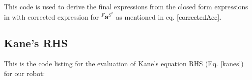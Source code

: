 \documentclass[a4paper,10pt]{article}
\begin{document}
This code is used to derive the final expressions from the closed form expressions in \cite{kim2005dynamic} with
corrected expression for ${}^F\mathbf{a}^{S^*}$ as mentioned in eq. \ref{correctedAcc}.




\subsection{Kane's RHS} \label{app4}

This is the code listing for the evaluation of Kane's equation RHS (Eq. \ref{kanes}) for our robot:






\end{document}
